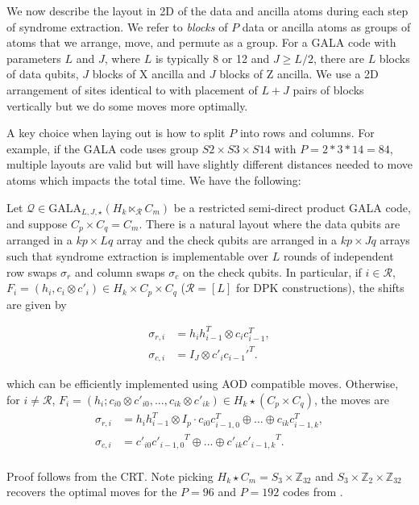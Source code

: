 We now describe the layout in 2D of the data and ancilla atoms during each step of syndrome extraction. We refer to \textit{blocks} of $P$ data or ancilla atoms as groups of atoms that we arrange, move, and permute as a group. For a GALA code with parameters $L$ and $J$, where $L$ is typically 8 or 12 and $J\ge L/2$, there are $L$ blocks of data qubits, $J$ blocks of X ancilla and $J$ blocks of Z ancilla. We use a 2D arrangement of sites identical to \cite{zhao2026ultrahighratequantumerrorcorrection} with placement of $L+J$ pairs of blocks vertically but we do some moves more optimally. 

A key choice when laying out is how to split $P$ into rows and columns. For example, if the GALA code uses group $S2\times S3\times S14$ with $P=2*3*14=84$, multiple layouts are valid but will have slightly different distances needed to move atoms which impacts the total time.  We have the following:

\begin{proposition}\label{prop:regular-moves}
    Let $\mathcal Q\in \mathrm{GALA}_{L,J, \star}(H_k\ltimes_{\mathcal{R}} C_m)$ be a restricted semi-direct product GALA code, and suppose $C_p\times C_q = C_m$. There is a natural layout where the data qubits are arranged in a $kp\times Lq$ array and the check qubits are arranged in a $kp\times Jq$ arrays such that syndrome extraction is implementable over $L$ rounds of independent row swaps $\sigma_r$ and column swaps $\sigma_c$ on the check qubits. In particular, if $i\in \mathcal{R}$, $F_i = (h_i, c_i\otimes c'_i)\in H_k\times C_p\times C_q$ ($\mathcal{R} = [L]$ for DPK constructions), the shifts are given by 

    \begin{align*}
        \sigma_{r,i} &= h_{i}h_{i-1}^T\otimes c_ic_{i-1}^T,\\
        \sigma_{c,i} &= I_J\otimes  c'_i{c_{i-1}'}^T.
    \end{align*}


    
    which can be efficiently implemented using AOD compatible moves. Otherwise, for $i\neq \mathcal{R}$, $F_i = (h_i; c_{i0}\otimes c'_{i0}, ..., c_{ik}\otimes c'_{ik})\in H_k\star(C_p\times C_q)$, the moves are
    \begin{align*}
        \sigma_{r,i} &= h_{i}h_{i-1}^T\otimes I_p \cdot c_{i0} c_{i-1,0}^T\oplus ...\oplus c_{ik} c_{i-1,k}^T,\\
        \sigma_{c,i} &= c'_{i0} {c'_{i-1,0}}^T\oplus ...\oplus c'_{ik} {c'_{i-1,k}}^T.\\
    \end{align*}
    \end{proposition}
    Proof follows from the CRT. Note picking $H_k\star C_m = S_3\times \mathbb Z_{32}$ and $S_3\times \mathbb Z_2\times \mathbb Z_{32} $ recovers the optimal moves for the $P=96$ and $P=192$ codes from \cite{zhao2026ultrahighratequantumerrorcorrection}.

